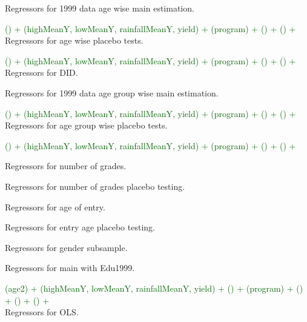 Regressors for 1999 data age wise main estimation. \gobblepars

\textcolor{darkgreen}{\textsf{\footnotesize () + (highMeanY, lowMeanY, rainfallMeanY, yield) + (program) + () + () +}}\\ 
Regressors for age wise placebo tests. \gobblepars 

\textcolor{darkgreen}{\textsf{\footnotesize () + (highMeanY, lowMeanY, rainfallMeanY, yield) + (program) + () + () +}}\\ 

Regressors for DID. \gobblepars


Regressors for 1999 data age group wise main estimation. \gobblepars

\textcolor{darkgreen}{\textsf{\footnotesize () + (highMeanY, lowMeanY, rainfallMeanY, yield) + (program) + () + () +}} \\ 
Regressors for age group wise placebo tests. \gobblepars

\textcolor{darkgreen}{\textsf{\footnotesize () + (highMeanY, lowMeanY, rainfallMeanY, yield) + (program) + () + () +}}



Regressors for number of grades. \gobblepars

Regressors for number of grades placebo testing. \gobblepars 

Regressors for age of entry. \gobblepars
\begin{Schunk}
\end{Schunk}
Regressors for entry age placebo testing. \gobblepars 


Regressors for gender subsample. \gobblepars 

Regressors for main with Edu1999. \gobblepars

\textcolor{darkgreen}{\textsf{\footnotesize (age2) + (highMeanY, lowMeanY, rainfallMeanY, yield) + () + (program) + () + () + () +}}\\ Regressors for OLS. \gobblepars


